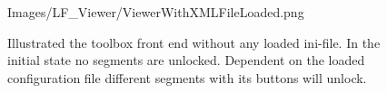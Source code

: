 \begin{figure}[htb]
	\begin{minipage}[h]{\textwidth}
		\centering
		\begin{overpic}[width=0.7\linewidth]{Images/LF_Viewer/ViewerWithXMLFileLoaded.png}
		\end{overpic}
	\end{minipage}
	\caption{Illustrated the toolbox front end without any loaded ini-file. In the initial state no segments are unlocked. Dependent on the loaded configuration file different segments with its buttons will unlock.}
	\label{figure_LFViewer_frontend_withXML}
\end{figure}
